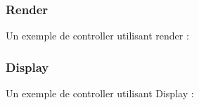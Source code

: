 \documentclass{beamer}
\begin{document}
\begin{frame}
    \frametitle{Render}

    Un exemple de controller utilisant render :


    \begin{center}
        
    \end{center}
\end{frame}

\begin{frame}
    \frametitle{Display}

    Un exemple de controller utilisant Display :


    \begin{center}
        
    \end{center}
\end{frame}
\end{document}

